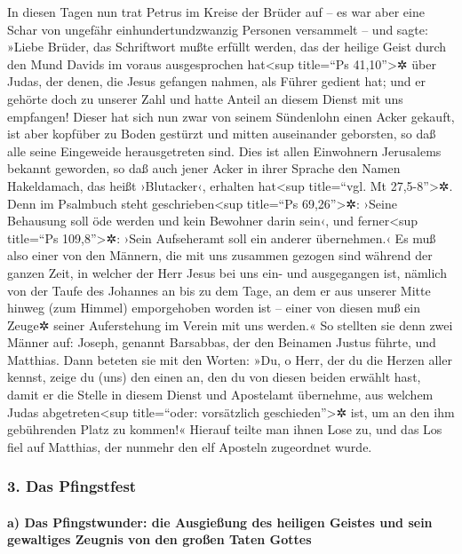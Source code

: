  In diesen Tagen nun trat Petrus im Kreise der Brüder auf
-- es war aber eine Schar von ungefähr einhundertundzwanzig Personen
versammelt -- und sagte:  »Liebe Brüder, das Schriftwort
mußte erfüllt werden, das der heilige Geist durch den Mund Davids im
voraus ausgesprochen hat\textless sup title=``Ps 41,10''\textgreater✲
über Judas, der denen, die Jesus gefangen nahmen, als Führer gedient
hat;  und er gehörte doch zu unserer Zahl und hatte
Anteil an diesem Dienst mit uns empfangen!  Dieser hat
sich nun zwar von seinem Sündenlohn einen Acker gekauft, ist aber
kopfüber zu Boden gestürzt und mitten auseinander geborsten, so daß alle
seine Eingeweide herausgetreten sind.  Dies ist allen
Einwohnern Jerusalems bekannt geworden, so daß auch jener Acker in ihrer
Sprache den Namen Hakeldamach, das heißt ›Blutacker‹, erhalten
hat\textless sup title=``vgl. Mt 27,5-8''\textgreater✲. 
Denn im Psalmbuch steht geschrieben\textless sup title=``Ps
69,26''\textgreater✲: ›Seine Behausung soll öde werden und kein Bewohner
darin sein‹, und ferner\textless sup title=``Ps 109,8''\textgreater✲:
›Sein Aufseheramt soll ein anderer übernehmen.‹  Es muß
also einer von den Männern, die mit uns zusammen gezogen sind während
der ganzen Zeit, in welcher der Herr Jesus bei uns ein- und ausgegangen
ist,  nämlich von der Taufe des Johannes an bis zu dem
Tage, an dem er aus unserer Mitte hinweg (zum Himmel) emporgehoben
worden ist -- einer von diesen muß ein Zeuge✲ seiner Auferstehung im
Verein mit uns werden.«  So stellten sie denn zwei Männer
auf: Joseph, genannt Barsabbas, der den Beinamen Justus führte, und
Matthias.  Dann beteten sie mit den Worten: »Du, o Herr,
der du die Herzen aller kennst, zeige du (uns) den einen an, den du von
diesen beiden erwählt hast,  damit er die Stelle in
diesem Dienst und Apostelamt übernehme, aus welchem Judas
abgetreten\textless sup title=``oder: vorsätzlich
geschieden''\textgreater✲ ist, um an den ihm gebührenden Platz zu
kommen!«  Hierauf teilte man ihnen Lose zu, und das Los
fiel auf Matthias, der nunmehr den elf Aposteln zugeordnet wurde.

\hypertarget{das-pfingstfest}{%
\subsubsection{3. Das Pfingstfest}\label{das-pfingstfest}}

\hypertarget{a-das-pfingstwunder-die-ausgieuxdfung-des-heiligen-geistes-und-sein-gewaltiges-zeugnis-von-den-grouxdfen-taten-gottes}{%
\paragraph{a) Das Pfingstwunder: die Ausgießung des heiligen Geistes und
sein gewaltiges Zeugnis von den großen Taten
Gottes}\label{a-das-pfingstwunder-die-ausgieuxdfung-des-heiligen-geistes-und-sein-gewaltiges-zeugnis-von-den-grouxdfen-taten-gottes}}

